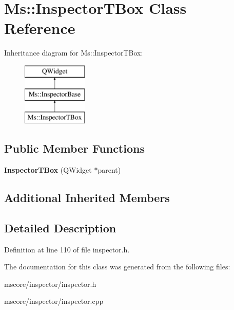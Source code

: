 \hypertarget{class_ms_1_1_inspector_t_box}{}\section{Ms\+:\+:Inspector\+T\+Box Class Reference}
\label{class_ms_1_1_inspector_t_box}
Inheritance diagram for Ms\+:\+:Inspector\+T\+Box\+:\begin{figure}[H]
\begin{center}
\leavevmode
\includegraphics[height=3.000000cm]{class_ms_1_1_inspector_t_box}
\end{center}
\end{figure}
\subsection*{Public Member Functions}
\begin{DoxyCompactItemize}
\item 
\mbox{\label{class_ms_1_1_inspector_t_box_a155f298abf477f94404f2c668a38ab62}} 
{\bfseries Inspector\+T\+Box} (Q\+Widget $\ast$parent)
\end{DoxyCompactItemize}
\subsection*{Additional Inherited Members}


\subsection{Detailed Description}


Definition at line 110 of file inspector.\+h.



The documentation for this class was generated from the following files\+:\begin{DoxyCompactItemize}
\item 
mscore/inspector/inspector.\+h\item 
mscore/inspector/inspector.\+cpp\end{DoxyCompactItemize}
